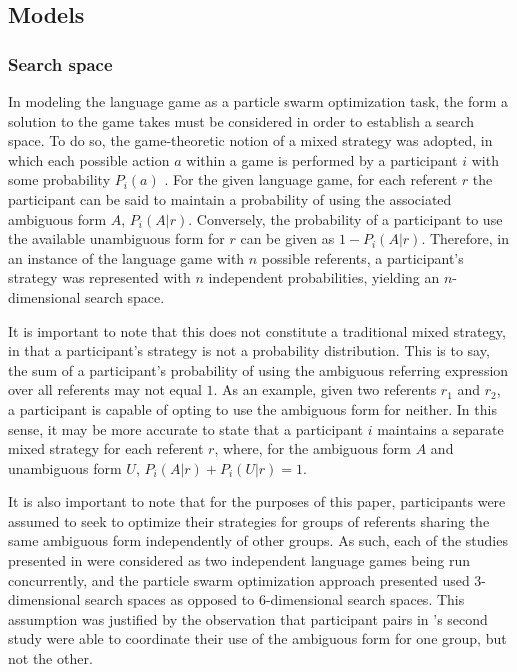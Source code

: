 \documentclass[12pt,a4paper]{article}
\begin{document}
\subsection{Models}
\subsubsection{Search space}
\label{sec:search_space}

In modeling the \citeauthor{rohde2012} language game as a particle swarm optimization task, the form a solution to the game takes must be considered in order to establish a search space.  To do so, the game-theoretic notion of a mixed strategy was adopted, in which each possible action $a$ within a game is performed by a participant $i$ with some probability $P_i(a)$ \citep[p.~22]{benz2005}. For the given language game, for each referent $r$ the participant can be said to maintain a probability of using the associated ambiguous form $A$, $P_i(A|r)$. Conversely, the probability of a participant to use the available unambiguous form for $r$ can be given as $1 - P_i(A|r)$. Therefore, in an instance of the \citeauthor{rohde2012} language game with $n$ possible referents, a participant's strategy was represented with $n$ independent probabilities, yielding an $n$-dimensional search space. 

It is important to note that this does not constitute a traditional mixed strategy, in that a participant's strategy is not a probability distribution. This is to say, the sum of a participant's probability of using the ambiguous referring expression over all referents may not equal $1$. As an example, given two referents $r_1$ and $r_2$, a participant is capable of opting to use the ambiguous form for neither. In this sense, it may be more accurate to state that a participant $i$ maintains a separate mixed strategy for each referent $r$, where, for the ambiguous form $A$ and unambiguous form $U$, $P_i(A|r) + P_i(U|r) = 1$.

It is also important to note that for the purposes of this paper, participants were assumed to seek to optimize their strategies for groups of referents sharing the same ambiguous form independently of other groups. As such, each of the studies presented in \citeauthor{rohde2012} were considered as two independent language games being run concurrently, and the particle swarm optimization approach presented used 3-dimensional search spaces as opposed to 6-dimensional search spaces. This assumption was justified by the observation that participant pairs in \citeauthor{rohde2012}'s second study were able to coordinate their use of the ambiguous form for one group, but not the other. 
\end{document}
